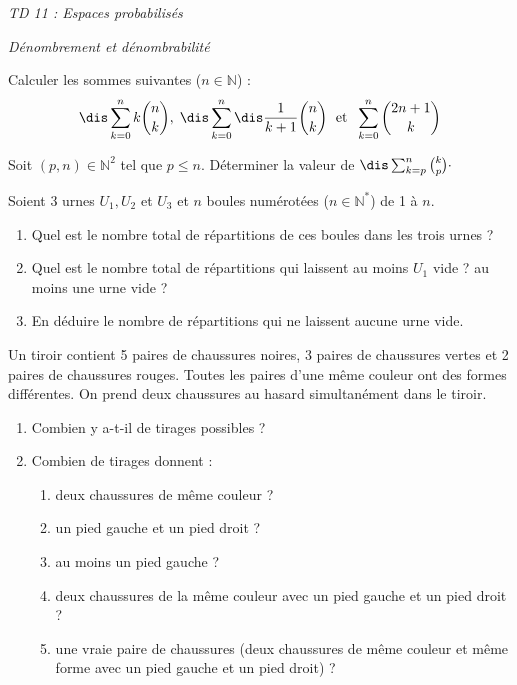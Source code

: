 \documentclass[a4paper,10pt]{report}
\begin{document}
\everymath{\displaystyle}
\begin{center}
\textit{{ {\huge TD 11 : Espaces probabilisés}}}
\end{center}

\bigskip


\begin{center}
\textit{{ {\large Dénombrement et dénombrabilité}}}
\end{center}

\medskip

\begin{Exercice}{} Calculer les sommes suivantes ($n \in \mathbb{N}$) : 
$$\dis\sum_{k=0}^n k \binom{n}{k}, \; \dis\sum_{k=0}^n\dis\frac{1}{k+1} \binom{n}{k} \; \hbox{ et } \; \sum_{k=0}^n \binom{2n+1}{k}$$
\end{Exercice}

\begin{Exercice}{} Soit $(p, n) \in \mathbb{N}^2$ tel que $p \leq n$. Déterminer la valeur de $\dis\sum_{k=p}^n{k\choose p} \cdot$

\end{Exercice}


\begin{Exercice}{}Soient $3$ urnes $U_1,U_2$ et $U_3$ et $n$ boules numérotées ($n \in \mathbb{N}^*$) de 1 à $n$.
\begin{enumerate}
\item Quel est le nombre total de répartitions de ces boules dans les trois urnes ?
\item Quel est le nombre total de répartitions qui laissent au moins $U_1$ vide ? au moins une urne vide ?
\item En déduire le nombre de répartitions qui ne laissent aucune urne vide.
\end{enumerate}
\end{Exercice}



\begin{Exercice}{} Un tiroir contient 5 paires de chaussures noires, 3 paires de chaussures vertes et 2 paires de chaussures rouges. Toutes les paires d'une même couleur ont des formes différentes. On prend deux chaussures au hasard simultanément dans le tiroir.
\begin{enumerate}
\item Combien y a-t-il de tirages possibles ?
\item 
Combien de tirages donnent :
\begin{enumerate}
\item deux chaussures de même couleur ?
\item un pied gauche et un pied droit ?
\item au moins un pied gauche ?
\item deux chaussures de la même couleur avec un pied gauche et un pied droit ?
\item une vraie paire de chaussures (deux chaussures de même couleur et même forme avec un pied gauche et un pied droit) ?
\end{enumerate}
\end{enumerate}
\end{Exercice}
\end{document}
